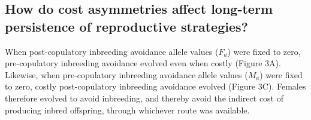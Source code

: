 \documentclass[10pt,letterpaper]{article}
\begin{document}

\subsection*{How do cost asymmetries affect long-term persistence of reproductive strategies?}

When post-copulatory inbreeding avoidance allele values ($F_{a}$) were fixed to zero, pre-copulatory inbreeding avoidance evolved even when costly (Figure 3A). Likewise, when pre-copulatory inbreeding avoidance allele values ($M_{a}$) were fixed to zero, costly post-copulatory inbreeding avoidance evolved (Figure 3C). Females therefore evolved to avoid inbreeding, and thereby avoid the indirect cost of producing inbred offspring, through whichever route was available. 
\end{document}
